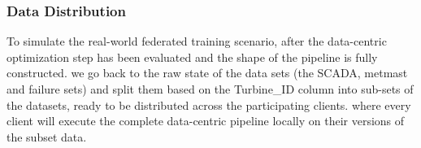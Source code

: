 \documentclass[12pt]{article}
\begin{document}


\subsubsection{Data Distribution}
To simulate the real-world federated training scenario, after the data-centric optimization step has been evaluated and the shape of the pipeline is fully constructed. we go back to the raw state of the data sets (the SCADA, metmast and failure sets) and split them based on the Turbine\_ID column into sub-sets of the datasets, ready to be distributed across the participating clients. where every client will execute the complete data-centric pipeline locally on their versions of the subset data.  
\end{document}
